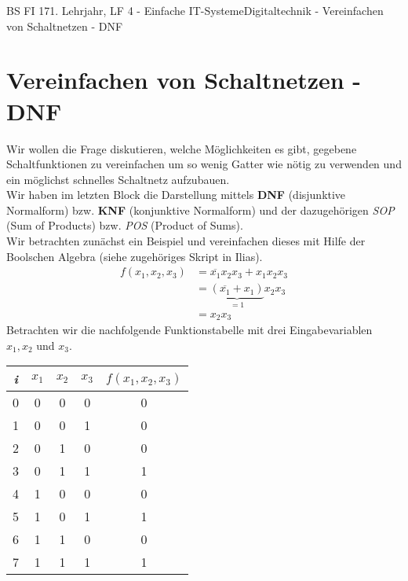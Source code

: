 \documentclass[11pt,twocolumn,oneside,openany,headings=optiontotoc,11pt,numbers=noenddot]{article}
\begin{document}
	\begin{worksheet}{BS FI 17}{1. Lehrjahr, LF 4 - Einfache IT-Systeme}{Digitaltechnik - Vereinfachen von Schaltnetzen - DNF}
		\section{Vereinfachen von Schaltnetzen - DNF}
		Wir wollen die Frage diskutieren, welche Möglichkeiten es gibt, gegebene Schaltfunktionen zu vereinfachen um so wenig Gatter wie nötig zu verwenden und ein möglichst schnelles Schaltnetz aufzubauen.\\
		Wir haben im letzten Block die Darstellung mittels \textbf{DNF} (disjunktive Normalform) bzw. \textbf{KNF} (konjunktive Normalform) und der dazugehörigen \textit{SOP} (Sum of Products) bzw. \textit{POS} (Product of Sums).\\
		Wir betrachten zunächst ein Beispiel und vereinfachen dieses mit Hilfe der Boolschen Algebra (siehe zugehöriges Skript in Ilias).
		\begin{align*}
			f(x_1,x_2,x_3) &= \overline{x_1}x_2x_3 + x_1x_2x_3\\
			&= \underbrace{(\overline{x_1} + x_1)}_{=1}x_2x_3\\
			&= x_2x_3
		\end{align*}
		Betrachten wir die nachfolgende Funktionstabelle mit drei Eingabevariablen \(x_1, x_2\) und \(x_3\).
		\begin{center}
			\begin{tabular}{|c|ccc|c|}
				\hline
				\textit{i} & \(x_1\) & \(x_2\) & \(x_3\) & \(f(x_1,x_2,x_3)\)\\
				\hline
				0 & 0 & 0 & 0 & 0\\
				\hline
				1 & 0 & 0 & 1 & 0\\
				\hline
				2 & 0 & 1 & 0 & 0\\
				\hline
				3 & 0 & 1 & 1 & 1\\
				\hline
				4 & 1 & 0 & 0 & 0\\
				\hline
				5 & 1 & 0 & 1 & 1\\
				\hline
				6 & 1 & 1 & 0 & 0\\
				\hline
				7 & 1 & 1 & 1 & 1\\
				\hline
			\end{tabular}
		\end{center}

\end{worksheet}
\end{document}
